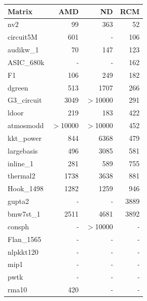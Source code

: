 \begin{table}[htbp]
  \centering
  \label{tab:breakeven_x86}
  \begin{tabular}{lrrr}
    \toprule
    \textbf{Matrix} & \textbf{AMD} & \textbf{ND} & \textbf{RCM}  \\
    \midrule
    nv2 & 99 & 363 & 52 \\
    circuit5M & 601 & \textit{ - } & 106 \\
    audikw\_1 & 70 & 147 & 123 \\
    ASIC\_680k & \textit{ - } & \textit{ - } & 162 \\
    F1 & 106 & 249 & 182 \\
    dgreen & 513 & 1707 & 266 \\
    G3\_circuit & 3049 & $>$10000 & 291 \\
    ldoor & 219 & 183 & 422 \\
    atmosmodd & $>$10000 & $>$10000 & 452 \\
    kkt\_power & 844 & 6368 & 479 \\
    largebasis & 496 & 3085 & 581 \\
    inline\_1 & 281 & 589 & 755 \\
    thermal2 & 1738 & 3638 & 881 \\
    Hook\_1498 & 1282 & 1259 & 946 \\
    gupta2 & \textit{ - } & \textit{ - } & 3889 \\
    bmw7st\_1 & 2511 & 4681 & 3892 \\
    consph & \textit{ - } & $>$10000 & \textit{ - } \\
    Flan\_1565 & \textit{ - } & \textit{ - } & \textit{ - } \\
    nlpkkt120 & \textit{ - } & \textit{ - } & \textit{ - } \\
    mip1 & \textit{ - } & \textit{ - } & \textit{ - } \\
    pwtk & \textit{ - } & \textit{ - } & \textit{ - } \\
    rma10 & 420 & \textit{ - } & \textit{ - } \\
    \bottomrule
  \end{tabular}
\end{table}